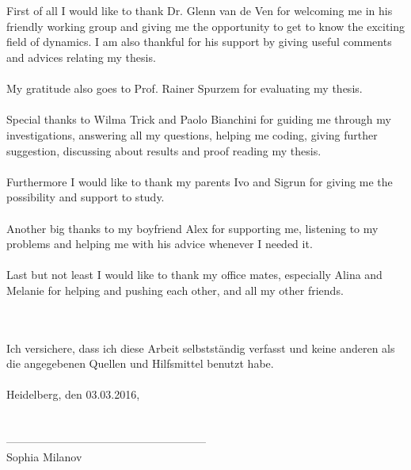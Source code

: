 \\
\\First of all I would like to thank Dr. Glenn van de Ven for welcoming me in his friendly working group and giving me the opportunity to get to know the exciting field of dynamics. I am also thankful for his support by giving useful comments and advices relating my thesis.\\
\\
My gratitude also goes to Prof. Rainer Spurzem for evaluating my thesis.\\
\\
Special thanks to Wilma Trick and Paolo Bianchini for guiding me through my investigations, answering all my questions, helping me coding, giving further suggestion, discussing about results and proof reading my thesis.\\
\\
Furthermore I would like to thank my parents Ivo and Sigrun for giving me the possibility and support to study.  \\
\\
Another big thanks to my boyfriend Alex for supporting me, listening to my problems and helping me with his advice whenever I needed it. \\
\\
Last but not least I would like to thank my office mates, especially Alina and Melanie for helping and pushing each other, and all my other friends.


\newpage
{}\\
\\
Ich versichere, dass ich diese Arbeit selbstst\"{a}ndig verfasst und keine anderen als die angegebenen Quellen und Hilfsmittel benutzt habe.
\\ \\
Heidelberg, den 03.03.2016,\\
\\
\\
------------------------------------------------------ \\
{\footnotesize Sophia Milanov}